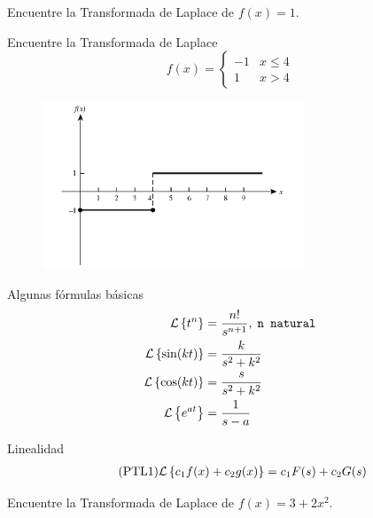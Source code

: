  \begin{resuelto}
  \label{bron:exmp:21.4}
  Encuentre la Transformada de Laplace de
  $f(x)=1.$
 \end{resuelto}




 \begin{resuelto}
  \label{bron:exmp:21.9}
  Encuentre la Transformada de Laplace
  $$f(x)=\begin{cases}
     -1 & x\leq 4\\
     1 & x>4
    \end{cases}
$$
 \end{resuelto}




 \begin{figure}
 \centering
 \includegraphics[height=5cm,keepaspectratio=true]{./edo/img0401.png}
 \label{fig:0401}
\end{figure}


{Algunas fórmulas básicas}
\begin{align}
 \label{lap:11}
 \mathcal{L}\left\{ t^{n} \right\} &= \dfrac{n!}{s^{n+1}}, \; \texttt{n natural} \\
 \label{lap:13}
 \mathcal{L}\left\{ \sin(kt) \right\}&=\dfrac{k}{s^2+k^2} \\
 \label{lap:14}
 \mathcal{L}\left\{ \cos(kt) \right\}&=\dfrac{s}{s^2+k^2} \\
 \label{lap:15}
 \mathcal{L}\left\{ e^{at} \right\}&=\frac{1}{s-a}
\end{align}



{Linealidad}
\begin{align}
  \label{bron:21.3}
  \tag{PTL1}
  \mathcal{L}\left\{ c_{1}f(x)+c_{2}g(x) \right\}=c_{1}F(s)+c_{2}G(s)
\end{align}



 \begin{resuelto}
 \label{bron:exmp:21.10}
 Encuentre la Transformada de Laplace de $f(x)=3+2x^{2}.$
 \end{resuelto}



